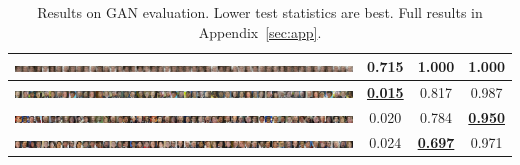 \documentclass[a4paper]{article}
\begin{document}
\begin{table}
{\begin{tabular}{cccc}
      \includegraphics[width=\textwidth,trim={1536px 0 0 0},clip]{figures/faces_g96_d64_ep1_generator.jpg}    & 0.715 & 1.000 & 1.000\\\hline
      \includegraphics[width=\textwidth,trim={1536px 0 0 0},clip]{figures/faces_g32_d64_ep200_generator.jpg}  & \underline{\bf 0.015} & 0.817 & 0.987\\
      \includegraphics[width=\textwidth,trim={1536px 0 0 0},clip]{figures/faces_g64_d64_ep100_generator.jpg}  & 0.020 & 0.784 & \underline{\bf 0.950}\\
      \includegraphics[width=\textwidth,trim={1536px 0 0 0},clip]{figures/faces_g96_d64_ep50_generator.jpg}   & 0.024 & \underline{\bf 0.697} & 0.971\\\hline
  \end{tabular}}
  \caption{Results on GAN evaluation. Lower test statistics are best. Full results in Appendix~\ref{sec:app}.}
  \label{table:littlegans}
  \end{table}
\end{document}
